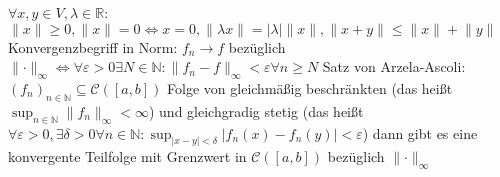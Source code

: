 \documentclass[9pt, landscape,a4paper]{extarticle}
\newcommand*\abs[1]{\lvert#1\rvert}
\newcommand*\norm[1]{\lVert#1\rVert}
\newcommand\eps{\varepsilon}
\begin{document}
\begin{multicols*}{4}
  $\forall x, y \in V, \lambda \in \mathbb{R}$: \\
  $\norm{x} \geq 0, \norm{x} = 0\iff x = 0, \norm{\lambda x} = \abs{\lambda} \norm{x}, \norm{x + y} \leq \norm{x} + \norm{y}$ \\
  Konvergenzbegriff in Norm: $f_n \to f$ bezüglich $\norm{\cdot}_\infty \iff \forall \eps > 0 \exists N\in \mathbb{N}: \norm{f_n - f}_\infty < \eps \forall n \geq N$
  Satz von Arzela-Ascoli: $(f_n)_{n\in\mathbb{N}} \subseteq \mathcal{C}([a,b])$ Folge von gleichmäßig beschränkten (das heißt $\sup_{n\in\mathbb{N}} \norm{f_n}_\infty < \infty$) und
  gleichgradig stetig (das heißt $\forall \eps > 0, \exists \delta > 0 \forall n\in\mathbb{N}: \sup_{\abs{x - y} < \delta} \abs{f_n(x) - f_n(y)} < \eps$)
  dann gibt es eine konvergente Teilfolge mit Grenzwert in $\mathcal{C}([a,b])$ bezüglich $\norm{\cdot}_\infty$

\end{multicols*}
\end{document}
